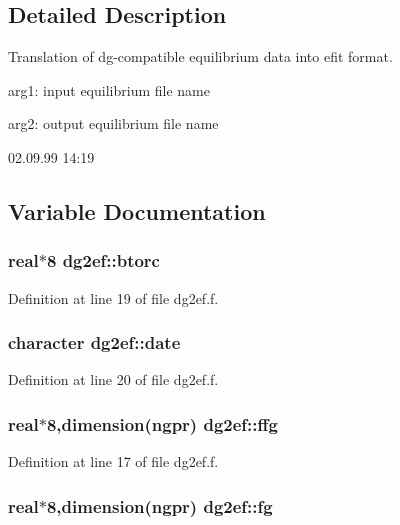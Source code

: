 \subsection{Detailed Description}
Translation of dg-compatible equilibrium data into efit format. 

arg1: input equilibrium file name

arg2: output equilibrium file name

\begin{Desc}
\item[Version:]02.09.99 14:19 \end{Desc}


\subsection{Variable Documentation}
\hypertarget{namespacedg2ef_f28ab1aa3e4ed0b74bc1f933efb836bb}{
\subsubsection[btorc]{\setlength{\rightskip}{0pt plus 5cm}real$\ast$8 {\bf dg2ef::btorc}}}
\label{namespacedg2ef_f28ab1aa3e4ed0b74bc1f933efb836bb}




Definition at line 19 of file dg2ef.f.\hypertarget{namespacedg2ef_83146ae956a47c175883e686881a853d}{
\subsubsection[date]{\setlength{\rightskip}{0pt plus 5cm}character {\bf dg2ef::date}}}
\label{namespacedg2ef_83146ae956a47c175883e686881a853d}




Definition at line 20 of file dg2ef.f.\hypertarget{namespacedg2ef_b703812ea0c4b8c00de2c32fa197438d}{
\subsubsection[ffg]{\setlength{\rightskip}{0pt plus 5cm}real$\ast$8,dimension(ngpr) {\bf dg2ef::ffg}}}
\label{namespacedg2ef_b703812ea0c4b8c00de2c32fa197438d}




Definition at line 17 of file dg2ef.f.\hypertarget{namespacedg2ef_25a2c0596b3c82876975302256bcf013}{
\subsubsection[fg]{\setlength{\rightskip}{0pt plus 5cm}real$\ast$8,dimension(ngpr) {\bf dg2ef::fg}}}
\label{namespacedg2ef_25a2c0596b3c82876975302256bcf013}




